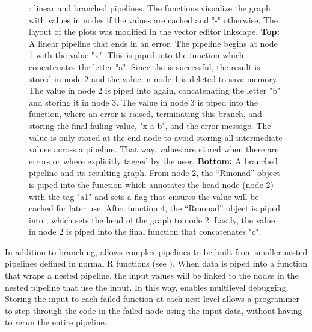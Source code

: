 \begin{figure}[!htbp]
  \caption{: linear and branched pipelines. The  functions visualize the graph with values in nodes if the values are cached and "-" otherwise. The layout of the plots was modified in the vector editor Inkscape. \textbf{Top:} A linear  pipeline that ends in an error. The pipeline begins at node 1 with the value "x". This is piped into the  function which concatenates the letter "a". Since the  is successful, the result is stored in node 2 and the value in node 1 is deleted to save memory. The value in node 2 is piped into  again, concatenating the letter "b" and storing it in node 3. The value in node 3 is piped into the  function, where an error is raised, terminating this branch, and storing the final failing value, "x a b", and the error message. The value is only stored at the end node to avoid storing all intermediate values across a pipeline. That way, values are stored when there are errors or where explicitly tagged by the user.  \textbf{Bottom:} A branched  pipeline and its resulting graph. From node 2, the ``Rmonad'' object is piped into the  function which annotates the head node (node 2) with the tag "a1" and sets a flag that ensures the value will be cached for later use.  After function 4, the ``Rmonad'' object is piped into , which sets the head of the graph to node 2. Lastly, the value in node 2 is piped into the final  function that concatenates "c".}
  \label{fig:rmonad-branch}
\end{figure}


In addition to branching,  allows complex pipelines to be built
from smaller nested pipelines defined in normal R functions (see
). When data is piped into a function that wraps a
nested  pipeline, the input values will be linked to the nodes
in the nested pipeline that use the input. In this way,  enables
multilevel debugging. Storing the input to each failed function at each
nest level allows a programmer to step through the code in
the failed node using the input data, without having to rerun the entire
pipeline.

